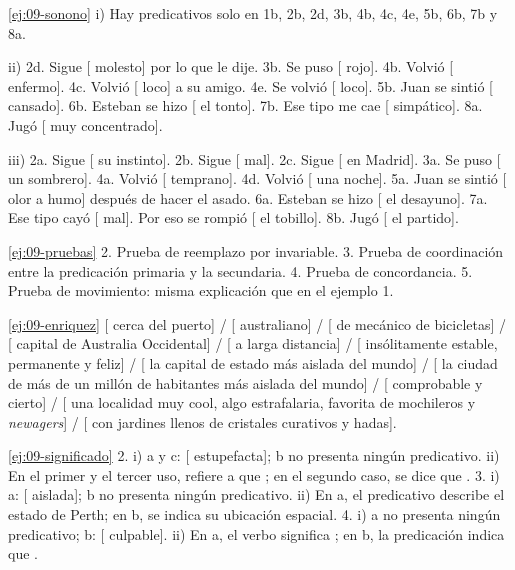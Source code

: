 \begin{solucion}{\ref{ej:09-sonono}}
i) Hay predicativos solo en 1b, 2b, 2d, 3b, 4b, 4c, 4e, 5b, 6b, 7b y 8a.

ii) 2d. Sigue [ molesto] por lo que le dije. 3b. Se puso [
rojo]. 4b. Volvió [ enfermo]. 4c. Volvió [ loco] a su
amigo. 4e. Se volvió [ loco]. 5b. Juan se sintió [
cansado]. 6b. Esteban se hizo [ el tonto]. 7b. Ese tipo me cae
[ simpático]. 8a. Jugó [ muy concentrado].

iii) 2a. Sigue [ su instinto]. 2b. Sigue [ mal]. 2c.
Sigue [ en Madrid]. 3a. Se puso [ un sombrero]. 4a.
Volvió [ temprano]. 4d. Volvió [ una noche]. 5a. Juan
se sintió [ olor a humo] después de hacer el asado. 6a. Esteban se
hizo [ el desayuno]. 7a. Ese tipo cayó [ mal]. Por eso
se rompió [ el tobillo]. 8b. Jugó [ el partido].
\end{solucion}

\begin{solucion}{\ref{ej:09-pruebas}}
2. Prueba de reemplazo por  invariable. 3. Prueba de coordinación
entre la predicación primaria y la secundaria. 4. Prueba de concordancia. 5.
Prueba de movimiento: misma explicación que en el ejemplo 1.
\end{solucion}

\begin{solucion}{\ref{ej:09-enriquez}}
[ cerca del puerto] / [ australiano] / [ de mecánico
de bicicletas] / [ capital de Australia Occidental] / [ a larga
distancia] / [ insólitamente estable, permanente y feliz] / [
la capital de estado más aislada del mundo] / [ la ciudad de más de un
millón de habitantes más aislada del mundo] / [ comprobable y cierto] /
[ una localidad muy cool, algo estrafalaria, favorita de mochileros y
\textit{newagers}] / [ con jardines llenos de cristales curativos y
hadas].
\end{solucion}

\begin{solucion}{\ref{ej:09-significado}}
2. i) a y c: [ estupefacta]; b no presenta ningún predicativo. ii) En
el primer y el tercer uso,  refiere a que ; en el segundo caso, se dice que . 3. i) a: [ aislada]; b no presenta ningún
predicativo. ii) En a, el predicativo describe el estado de Perth; en b, se
indica su ubicación espacial. 4. i) a no presenta ningún predicativo; b:
[ culpable]. ii) En a, el verbo  significa ; en b, la predicación indica que .
\end{solucion}

